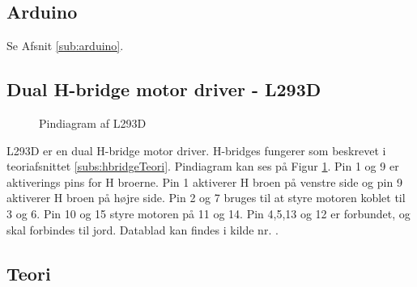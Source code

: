 \subsection{Arduino}
Se Afsnit \ref{sub:arduino}.

\subsection{Dual H-bridge motor driver - L293D}

		\begin{figure}[H] \label{fig:pindiagramL293D}
			\centering 
			\caption{Pindiagram af L293D}
		\end{figure}
	L293D er en dual H-bridge motor driver. H-bridges fungerer som beskrevet i teoriafsnittet \ref{subs:hbridgeTeori}.
	Pindiagram kan ses på Figur \ref{fig:pindiagramL293D}. Pin 1 og 9 er aktiverings pins for H broerne. Pin 1 aktiverer H broen på venstre side og pin 9 aktiverer H broen på højre side. Pin 2 og 7 bruges til at styre motoren koblet til 3 og 6. Pin 10 og 15 styre motoren på 11 og 14. Pin 4,5,13 og 12 er forbundet, og skal forbindes til jord. Datablad kan findes i kilde nr. \cite{komphbridge}.
\subsection{Teori}
